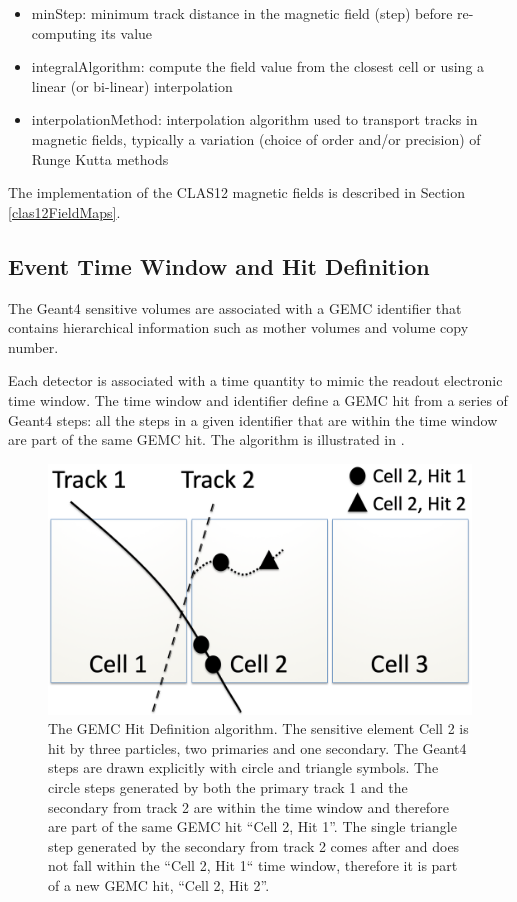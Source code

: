 \begin{itemize}
	\item minStep: minimum track distance in the magnetic field (step) before re-computing its value
	\item integralAlgorithm: compute the field value from the closest cell or using a linear (or bi-linear) interpolation
	\item interpolationMethod: interpolation algorithm used to transport tracks in magnetic fields, typically
		  a variation (choice of order and/or precision) of Runge Kutta \cite{rungeKutta} methods
\end{itemize}

The implementation of the CLAS12 magnetic fields is described in Section \ref{clas12FieldMaps}.

\subsection{Event Time Window and Hit Definition}

The Geant4 sensitive volumes are associated with a GEMC identifier that contains hierarchical information such as mother volumes
and volume copy number.

Each detector is associated with a time quantity to mimic the readout electronic time window. The time window and identifier
define a GEMC hit from a series of Geant4 steps: all the steps in a given identifier that are within the time window
are part of the same GEMC hit. The algorithm is illustrated in .

\begin{figure}
	\centering
	\includegraphics[width=0.99\columnwidth,keepaspectratio]{img/hitDefinition.png}
	\caption{The GEMC Hit Definition algorithm. The sensitive element Cell 2 is hit by three particles, two primaries and one secondary.
             The Geant4 steps are drawn explicitly with circle and triangle symbols. The circle steps generated by both the primary track 1 and the secondary
             from track 2 are within the time window and therefore are part of the same GEMC hit ``Cell 2, Hit 1''.
             The single triangle step generated by the secondary from track 2 comes after and does not fall within the ``Cell 2, Hit 1``
             time window, therefore it is part of a new GEMC hit, ``Cell 2, Hit 2''.}
	\label{fig:hitDefinition}
\end{figure}

